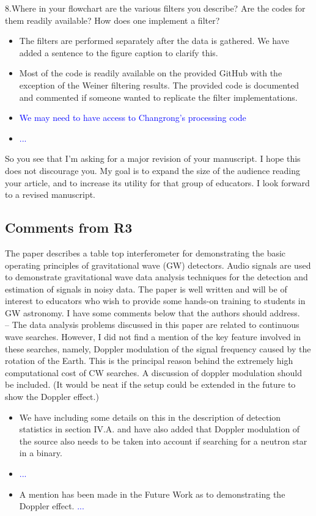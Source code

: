 \documentclass{article}
\newcommand{\todo}{\textcolor{blue}}
\begin{document}
\noindent 8.Where in your flowchart are the various filters you describe?  Are the codes for them readily available?  How does one implement a filter?  
\begin{itemize}
\item The filters are performed separately after the data is gathered. We have added a sentence to the figure caption to clarify this. 
\item Most of the code is readily available on the provided GitHub with the exception of the Weiner filtering results. The provided code is documented and commented if someone wanted to replicate the filter implementations.
\item \todo{We may need to have access to Changrong's processing code}
\item \todo{...}
\end{itemize}


\noindent So you see that I'm asking for a major revision of your manuscript.  I hope this does not discourage you.  My goal is to expand the size of the audience reading your article, and to increase its utility for that group of educators.  I look forward to a revised manuscript.



\subsection*{Comments from R3}


The paper describes a table top interferometer for demonstrating the basic operating principles of gravitational wave (GW) detectors. Audio signals are used to demonstrate gravitational wave data analysis techniques for the detection and estimation of signals in noisy data. The paper is well written and will be of interest to educators who wish to provide some hands-on training to students in GW astronomy. I have some comments below that the authors should address.\\

\noindent 
-- The data analysis problems discussed in this paper are related to continuous wave searches. However, I did not find a mention of the key feature involved in these searches, namely, Doppler modulation of the signal frequency caused by the rotation of the Earth. This is the principal reason behind the extremely high computational cost of CW searches. A discussion of doppler modulation should be included. (It would be neat if the setup could be extended in the future to show the Doppler effect.)
\begin{itemize}
\item We have including some details on this in the description of detection statistics in section IV.A. and have also added that Doppler modulation of the source also needs to be taken into account if searching for a neutron star in a binary. 
\item \todo{...}
\item A mention has been made in the Future Work as to demonstrating the Doppler effect.
 \todo{...}
\end{itemize}
\end{document}
